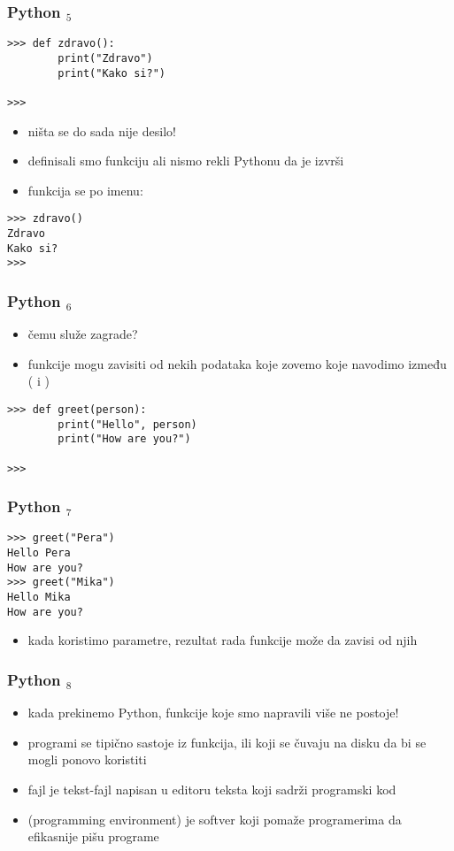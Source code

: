 \documentclass[utf8,compress]{beamer}
\begin{document}
\begin{frame}[fragile]
\frametitle{Python $_5$}
\begin{verbatim}
>>> def zdravo():
        print("Zdravo")
        print("Kako si?")
        
>>>
\end{verbatim}
\begin{itemize}
  \item ništa se do sada nije desilo!
  \item definisali smo funkciju ali nismo rekli Pythonu da je izvrši
  \item funkcija se  po imenu:
\end{itemize}
\begin{verbatim}
>>> zdravo()
Zdravo
Kako si?
>>>
\end{verbatim}
\end{frame}

\begin{frame}[fragile]
\frametitle{Python $_6$}
\begin{itemize}
  \item čemu služe zagrade?
  \item funkcije mogu zavisiti od nekih podataka koje zovemo  koje navodimo između ( i )
\end{itemize}
\begin{verbatim}
>>> def greet(person):
        print("Hello", person)
        print("How are you?")

>>>
\end{verbatim}
\end{frame}

\begin{frame}[fragile]
\frametitle{Python $_7$}
\begin{verbatim}
>>> greet("Pera")
Hello Pera
How are you?
>>> greet("Mika")
Hello Mika
How are you?
\end{verbatim}
\begin{itemize}
  \item kada koristimo parametre, rezultat rada funkcije može da zavisi od njih
\end{itemize}
\end{frame}

\begin{frame}[fragile]
\frametitle{Python $_8$}
\begin{itemize}
  \item kada prekinemo Python, funkcije koje smo napravili više ne postoje!
  \item programi se tipično sastoje iz funkcija,  ili  koji se čuvaju na disku da bi se mogli ponovo koristiti
  \item {} fajl je tekst-fajl napisan u editoru teksta koji sadrži programski kod
  \item {} (programming environment) je softver koji pomaže programerima da efikasnije pišu programe
\end{itemize}
\end{frame}
\end{document}
